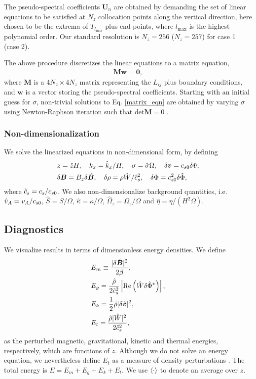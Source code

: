 The pseudo-spectral coefficients $\bm{U}_n$  are obtained by demanding
the set of linear equations to be satisfied at $N_z$ collocation
points along the vertical direction, here chosen to be the 
extrema of $T_{l_\mathrm{max}}$ plus end points, where 
$l_\mathrm{max}$ is the highest polynomial order. Our standard
resolution is $N_z=256$ ($N_z=257$) for case 1 (case 2).   

The above procedure discretizes the linear equations to a matrix equation,
\begin{align}\label{matrix_eqn}
\bm{M}\bm{w} = \mathbf{0}, 
\end{align}
where $\bm{M}$ is a $4N_z\times 4 N_z$ matrix representing the $L_{ij}$ 
plus boundary conditions, 
and $\bm{w}$ is a vector storing the pseudo-spectral coefficients. 
Starting with an initial guess for $\sigma$, non-trivial solutions to
Eq. \ref{matrix_eqn} are obtained by varying $\sigma$ using Newton-Raphson iteration 
such that $\mathrm{det}\bm{M}=0$ \citep[details can be found in][]{lin12}.


\subsubsection{Non-dimensionalization}\label{non-dim}
We solve the linearized equations in non-dimensional form,
by defining
\begin{align}
  &z=\hat{z}H,\quad k_x =  \hat{k}_x/H,\quad \sigma = \hat{\sigma}\Omega,
  \quad \delta\bm{v} = c_{s0} 
  \delta\hat{\bm{v}}, \\ 
  &\delta\bm{B} = B_z\delta\hat{\bm{B}},\quad
  \delta\rho = \rho\hat{W}/\hat{c}_s^2,\quad \delta\Phi =
  c_{s0}^2\delta\hat{\Phi},  
\end{align} 
where $\hat{c}_s=c_s/c_{s0}$. We also non-dimensionalize 
background quantities, i.e. $\hat{v}_A=v_A/c_{s0}$,
$\hat{S}=S/\Omega$, $\hat{\kappa}=\kappa/\Omega$,
$\hat{\Omega}_z=\Omega_z/\Omega$ and $\hat{\eta} = \eta/(H^2\Omega)$. 


\subsection{Diagnostics}
We visualize results in terms of dimensionless energy densities. We
define 
\begin{align}
  &E_m \equiv \frac{|\delta \hat{\bm{B}}|^2}{2\beta},\\
  &E_g = 
  \frac{\hat{\rho}}{2\hat{c}_s^2}\left|\operatorname{Re}\left(\hat{W}\delta\hat{\Phi}^*\right)\right|,\\  
  &E_k = \frac{1}{2}\hat{\rho}|\delta\hat{\bm{v}}|^2,\\
  &E_t = \frac{\hat{\rho}|\hat{W}|^2}{2\hat{c}_s^2},
\end{align}
as the perturbed magnetic, gravitational, kinetic and thermal
energies, respectively, which are functions of $z$. Although we do not
solve an energy equation, we nevertheless define $E_t$ as a measure of
density perturbations \citep{kojima89}. The total energy
is $E=E_m+E_g+E_k+E_t$. We use $\langle{\cdot}\rangle$ to denote an average over
$z$. 

